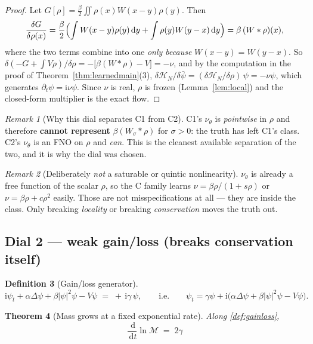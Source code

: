 \documentclass[11pt,a4paper]{article}
\theoremstyle{plain}
\newtheorem{theorem}{Theorem}[section]
\theoremstyle{definition}
\newtheorem{definition}[theorem]{Definition}
\theoremstyle{remark}
\newtheorem{remark}[theorem]{Remark}
\newcommand{\iu}{\mathrm{i}}
\newcommand{\dd}{\,\mathrm{d}}
\newcommand{\lap}{\Delta}
\newcommand{\Ham}{\mathcal{H}}
\newcommand{\Mass}{\mathcal{M}}
\begin{document}
\begin{proof}
Let $G[\rho] = \tfrac{\beta}{2}\iint\rho(x)W(x-y)\rho(y)$. Then
\[
\frac{\delta G}{\delta\rho(x)} = \frac{\beta}{2}\Bigl(\int W(x-y)\rho(y)\dd y + \int \rho(y)W(y-x)\dd y\Bigr)
= \beta\,(W*\rho)(x),
\]
where the two terms combine into one \emph{only because} $W(x-y)=W(y-x)$. So
$\delta(-G+\int V\rho)/\delta\rho = -\bigl[\beta(W*\rho) - V\bigr] = -\nu$, and by the
computation in the proof of Theorem~\ref{thm:learnedmain}(3),
$\delta\Ham_N/\delta\bar\psi = (\delta\Ham_N/\delta\rho)\,\psi = -\nu\psi$, which generates
$\partial_t\psi = \iu\nu\psi$. Since $\nu$ is real, $\rho$ is frozen
(Lemma~\ref{lem:local}) and the closed-form multiplier is the exact flow.
\end{proof}

\begin{remark}[Why this dial separates C1 from C2]
C1's $\nu_\theta$ is \emph{pointwise} in $\rho$ and therefore \textbf{cannot represent}
$\beta(W_\sigma*\rho)$ for $\sigma>0$: the truth has left C1's class. C2's $\nu_\theta$ is
an FNO on $\rho$ and \emph{can}. This is the cleanest available separation of the two, and
it is why the dial was chosen.
\end{remark}

\begin{remark}[Deliberately \emph{not} a saturable or quintic nonlinearity]
$\nu_\theta$ is already a free function of the scalar $\rho$, so the C family learns
$\nu=\beta\rho/(1+s\rho)$ or $\nu = \beta\rho + c\rho^2$ easily. Those are not
misspecifications at all --- they are inside the class. Only breaking \emph{locality} or
breaking \emph{conservation} moves the truth out.
\end{remark}

\subsection{Dial 2 --- weak gain/loss (breaks conservation itself)}

\begin{definition}[Gain/loss generator]
\label{def:gainloss}
\[
\iu\psi_t + \alpha\lap\psi + \beta|\psi|^2\psi - V\psi \;=\; +\,\iu\gamma\,\psi ,
\qquad\text{i.e.}\qquad
\psi_t = \gamma\psi + \iu\bigl(\alpha\lap\psi+\beta|\psi|^2\psi-V\psi\bigr).
\]
\end{definition}

\begin{theorem}[Mass grows at a fixed exponential rate]
\label{thm:gainloss}
Along \eqref{def:gainloss},
\[
\boxed{\;\frac{\dd}{\dd t}\ln\Mass \;=\; 2\gamma\;}
\]
\end{theorem}
\end{document}
